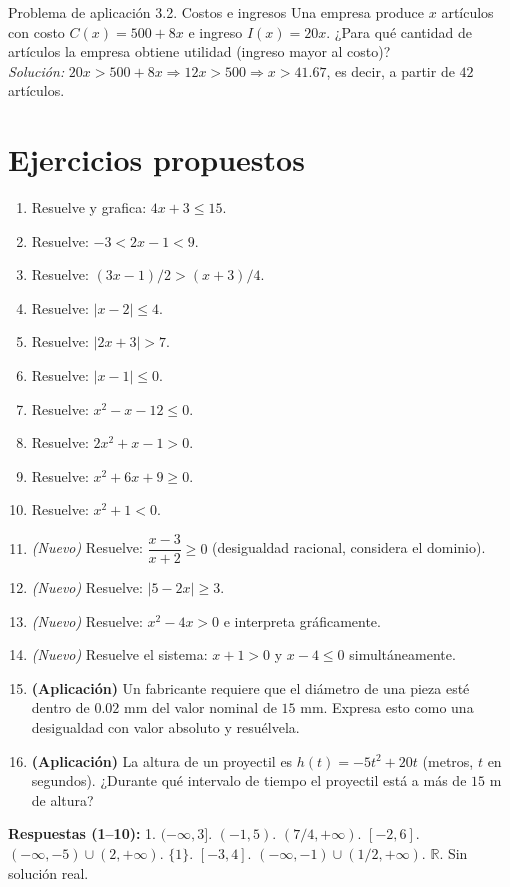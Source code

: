 \documentclass[12pt,letterpaper]{book}
\begin{document}
\begin{aplbox}{Problema de aplicación 3.2. Costos e ingresos}
Una empresa produce $x$ artículos con costo $C(x)=500+8x$ e ingreso $I(x)=20x$. ¿Para qué cantidad de artículos la empresa obtiene utilidad (ingreso mayor al costo)?\\
\textit{Solución:} $20x>500+8x\Rightarrow12x>500\Rightarrow x>41.67$, es decir, a partir de $42$ artículos.
\end{aplbox}

\section{Ejercicios propuestos}

\begin{enumerate}
\item Resuelve y grafica: $4x+3\leq15$.
\item Resuelve: $-3<2x-1<9$.
\item Resuelve: $(3x-1)/2>(x+3)/4$.
\item Resuelve: $|x-2|\leq4$.
\item Resuelve: $|2x+3|>7$.
\item Resuelve: $|x-1|\leq0$.
\item Resuelve: $x^2-x-12\leq0$.
\item Resuelve: $2x^2+x-1>0$.
\item Resuelve: $x^2+6x+9\geq0$.
\item Resuelve: $x^2+1<0$.
\item \textit{(Nuevo)} Resuelve: $\dfrac{x-3}{x+2}\geq0$ (desigualdad racional, considera el dominio).
\item \textit{(Nuevo)} Resuelve: $|5-2x|\geq3$.
\item \textit{(Nuevo)} Resuelve: $x^2-4x>0$ e interpreta gráficamente.
\item \textit{(Nuevo)} Resuelve el sistema: $x+1>0$ y $x-4\leq0$ simultáneamente.
\item \textbf{(Aplicación)} Un fabricante requiere que el diámetro de una pieza esté dentro de $0.02$ mm del valor nominal de $15$ mm. Expresa esto como una desigualdad con valor absoluto y resuélvela.
\item \textbf{(Aplicación)} La altura de un proyectil es $h(t)=-5t^2+20t$ (metros, $t$ en segundos). ¿Durante qué intervalo de tiempo el proyectil está a más de $15$ m de altura?
\end{enumerate}

\textbf{Respuestas (1--10):} 1. $(-\infty,3]$. $(-1,5)$. $(7/4,+\infty)$. $[-2,6]$. $(-\infty,-5)\cup(2,+\infty)$. $\{1\}$. $[-3,4]$. $(-\infty,-1)\cup(1/2,+\infty)$. $\mathbb{R}$. Sin solución real.
\end{document}
